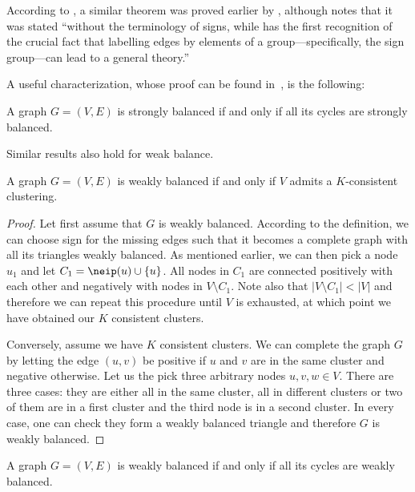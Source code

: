 \begin{aside}
According to \textcite{Huffner2010}, a similar theorem was proved earlier by \textcite[Theorem
X.11]{Konig36}, although \textcite{Zaslavsky2012} notes that it was stated \enquote{without the
terminology of signs, while \autocite{harary1953} has the first recognition of the crucial fact that
labelling edges by elements of a group---specifically, the sign group---can lead to a general
theory.}
\end{aside}

A useful characterization, whose proof can be found in~\autocite[page 122]{BookKleinberg2010}, is the
following:
\begin{theorem}
  A graph $G=(V,E)$ is strongly balanced if and only if all its cycles are strongly balanced.
\end{theorem}

Similar results also hold for weak balance.
\begin{theorem}\label{thm:weakbal-consistent}
  A graph $G=(V,E)$ is weakly balanced if and only if $V$ admits a $K$-consistent clustering.
\end{theorem}
\begin{proof}
  Let first assume that $G$ is weakly balanced. According to the definition, we can choose sign for
  the missing edges such that it becomes a complete graph with all its triangles weakly balanced. As
  mentioned earlier, we can then pick a node $u_1$ and let $C_1 = \neip(u) \cup \{u\}$. All
  nodes in $C_1$ are connected positively with each other and negatively with nodes in $V\setminus
  C_1$. Note also that $|V\setminus C_1| < |V|$ and therefore we can repeat this
  procedure until $V$ is exhausted, at which point we have obtained our $K$ consistent clusters.

  Conversely, assume we have $K$ consistent clusters. We can complete the graph $G$ by letting the edge
  $(u,v)$ be positive if $u$ and $v$ are in the same cluster and negative otherwise. Let us the pick
  three arbitrary nodes $u,v,w\in V$. There are three cases: they are either all in the same
  cluster, all in different clusters or two of them are in a first cluster and the third node is in
  a second cluster. In every case, one can check they form a weakly balanced triangle and therefore
  $G$ is weakly balanced.
\end{proof}
\begin{theorem}
  A graph $G=(V,E)$ is weakly balanced if and only if all its cycles are weakly balanced.
\end{theorem}

